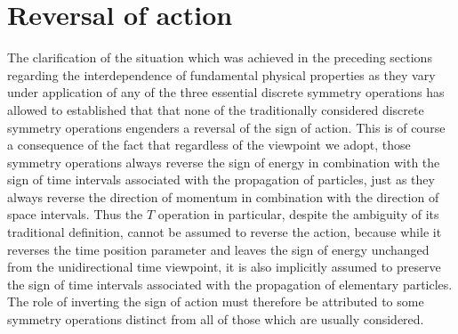 \documentclass[notitlepage,12pt]{report}
\begin{document}
\section{Reversal of action}

The clarification of the situation which was achieved in the preceding sections regarding the interdependence of fundamental physical properties as they vary under application of any of the three essential discrete symmetry operations has allowed to established that that none of the traditionally considered discrete symmetry operations engenders a reversal of the sign of action. This is of course a consequence of the fact that regardless of the viewpoint we adopt, those symmetry operations always reverse the sign of energy in combination with the sign of time intervals associated with the propagation of particles, just as they always reverse the direction of momentum in combination with the direction of space intervals. Thus the $T$ operation in particular, despite the ambiguity of its traditional definition, cannot be assumed to reverse the action, because while it reverses the time position parameter and leaves the sign of energy unchanged from the unidirectional time viewpoint, it is also implicitly assumed to preserve the sign of time intervals associated with the propagation of elementary particles. The role of inverting the sign of action must therefore be attributed to some symmetry operations distinct from all of those which are usually considered.
\end{document}
